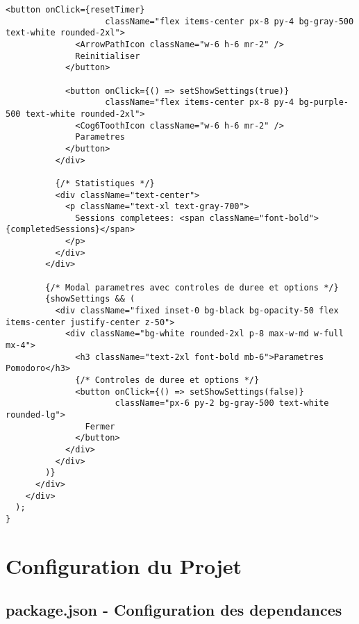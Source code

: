 \documentclass[12pt,a4paper]{article}
\begin{document}
\begin{lstlisting}[caption=Pomodoro.tsx - Timer Pomodoro complet (Robin)]
            <button onClick={resetTimer}
                    className="flex items-center px-8 py-4 bg-gray-500 text-white rounded-2xl">
              <ArrowPathIcon className="w-6 h-6 mr-2" />
              Reinitialiser
            </button>
            
            <button onClick={() => setShowSettings(true)}
                    className="flex items-center px-8 py-4 bg-purple-500 text-white rounded-2xl">
              <Cog6ToothIcon className="w-6 h-6 mr-2" />
              Parametres
            </button>
          </div>

          {/* Statistiques */}
          <div className="text-center">
            <p className="text-xl text-gray-700">
              Sessions completees: <span className="font-bold">{completedSessions}</span>
            </p>
          </div>
        </div>

        {/* Modal parametres avec controles de duree et options */}
        {showSettings && (
          <div className="fixed inset-0 bg-black bg-opacity-50 flex items-center justify-center z-50">
            <div className="bg-white rounded-2xl p-8 max-w-md w-full mx-4">
              <h3 className="text-2xl font-bold mb-6">Parametres Pomodoro</h3>
              {/* Controles de duree et options */}
              <button onClick={() => setShowSettings(false)} 
                      className="px-6 py-2 bg-gray-500 text-white rounded-lg">
                Fermer
              </button>
            </div>
          </div>
        )}
      </div>
    </div>
  );
}
\end{lstlisting}

\section{Configuration du Projet}

\subsection{package.json - Configuration des dependances}
\end{document}
